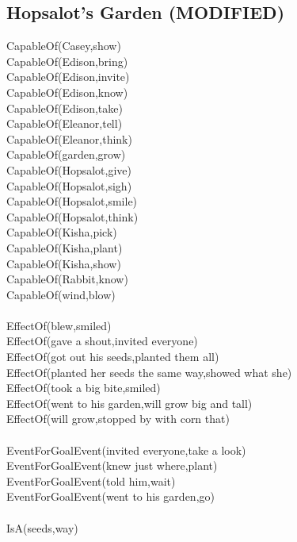 \subsection{Hopsalot's Garden (MODIFIED)}

\begin{multicols}{2}
\begin{footnotesize}
\noindent
CapableOf(Casey,show) \\
CapableOf(Edison,bring) \\
CapableOf(Edison,invite) \\
CapableOf(Edison,know) \\
CapableOf(Edison,take) \\
CapableOf(Eleanor,tell) \\
CapableOf(Eleanor,think) \\
CapableOf(garden,grow) \\
CapableOf(Hopsalot,give) \\
CapableOf(Hopsalot,sigh) \\
CapableOf(Hopsalot,smile) \\
CapableOf(Hopsalot,think) \\
CapableOf(Kisha,pick) \\
CapableOf(Kisha,plant) \\
CapableOf(Kisha,show) \\
CapableOf(Rabbit,know) \\
CapableOf(wind,blow) \\
~\\
EffectOf(blew,smiled) \\
EffectOf(gave a shout,invited everyone) \\
EffectOf(got out his seeds,planted them all) \\
EffectOf(planted her seeds the same way,showed what she) \\
EffectOf(took a big bite,smiled) \\
EffectOf(went to his garden,will grow big and tall) \\
EffectOf(will grow,stopped by with corn that) \\
~\\
EventForGoalEvent(invited everyone,take a look) \\
EventForGoalEvent(knew just where,plant) \\
EventForGoalEvent(told him,wait) \\
EventForGoalEvent(went to his garden,go) \\
~\\
IsA(seeds,way) \\

\end{footnotesize}
\end{multicols}
